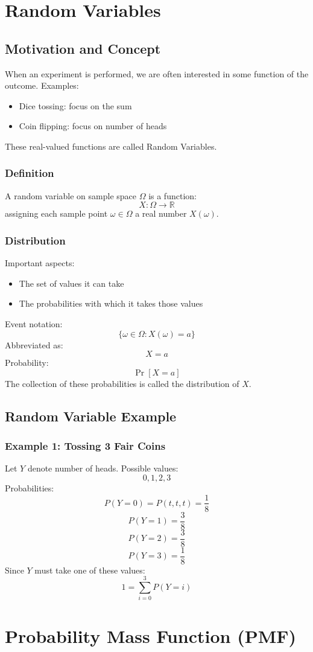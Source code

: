 \documentclass[12pt]{article}
\begin{document}
\section{Random Variables}
\subsection{Motivation and Concept}
When an experiment is performed, we are often interested in some function of the outcome.
Examples:
\begin{itemize}
    \item Dice tossing: focus on the sum
    \item Coin flipping: focus on number of heads
\end{itemize}
These real-valued functions are called Random Variables.
\subsubsection*{Definition}
A random variable on sample space $\Omega$ is a function:
\[
X:\Omega\to\mathbb{R}
\]
assigning each sample point $\omega\in\Omega$ a real number $X(\omega)$.
\subsubsection*{Distribution}
Important aspects:
\begin{itemize}
    \item The set of values it can take
    \item The probabilities with which it takes those values
\end{itemize}
Event notation:
\[
\{\omega\in\Omega:X(\omega)=a\}
\]
Abbreviated as:
\[
X=a
\]
Probability:
\[
\Pr[X=a]
\]
The collection of these probabilities is called the distribution of $X$.
\subsection{Random Variable Example}
\subsubsection*{Example 1: Tossing 3 Fair Coins}
Let $Y$ denote number of heads.
Possible values:
\[
0,1,2,3
\]
Probabilities:
\[
P(Y=0)=P(t,t,t)=\frac18
\]
\[
P(Y=1)=\frac38
\]
\[
P(Y=2)=\frac38
\]
\[
P(Y=3)=\frac18
\]
Since $Y$ must take one of these values:
\[
1=\sum_{i=0}^{3}P(Y=i)
\]
\section{Probability Mass Function (PMF)}
\end{document}
